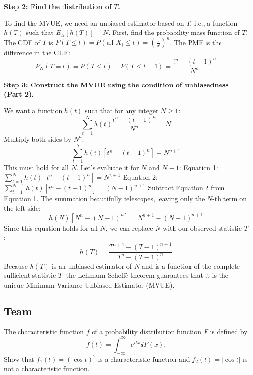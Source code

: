 \begin{solution}
\textbf{Step 2: Find the distribution of $T$.}

To find the MVUE, we need an unbiased estimator based on $T$, i.e., a function $h(T)$ such that $E_N[h(T)] = N$.
First, find the probability mass function of $T$.
The CDF of $T$ is $P(T \leq t) = P(\text{all } X_i \leq t) = \left( \frac{t}{N} \right)^n$.
The PMF is the difference in the CDF:
\[ P_N(T = t) = P(T \leq t) - P(T \leq t-1) = \frac{t^n - (t-1)^n}{N^n} \]

\textbf{Step 3: Construct the MVUE using the condition of unbiasedness (Part 2).}

We want a function $h(t)$ such that for any integer $N \geq 1$:
\[ \sum_{t=1}^N h(t) \frac{t^n - (t-1)^n}{N^n} = N \]
Multiply both sides by $N^n$:
\[ \sum_{t=1}^N h(t) \left[ t^n - (t-1)^n \right] = N^{n+1} \]
This must hold for all $N$. Let's evaluate it for $N$ and $N-1$:
Equation 1: $\sum_{t=1}^N h(t) \left[ t^n - (t-1)^n \right] = N^{n+1}$
Equation 2: $\sum_{t=1}^{N-1} h(t) \left[ t^n - (t-1)^n \right] = (N-1)^{n+1}$
Subtract Equation 2 from Equation 1. The summation beautifully telescopes, leaving only the $N$-th term on the left side:
\[ h(N) \left[ N^n - (N-1)^n \right] = N^{n+1} - (N-1)^{n+1} \]
Since this equation holds for all $N$, we can replace $N$ with our observed statistic $T$:
\[ h(T) = \frac{T^{n+1} - (T-1)^{n+1}}{T^n - (T-1)^n} \]
Because $h(T)$ is an unbiased estimator of $N$ and is a function of the complete sufficient statistic $T$, the Lehmann-Scheffé theorem guarantees that it is the unique Minimum Variance Unbiased Estimator (MVUE).
\end{solution}

\subsection{Team}

\begin{exercise}
\label{probability:2013:7}
The characteristic function $f$ of a probability distribution function $F$ is defined by
\[ f(t) = \int_{-\infty}^{\infty} e^{itx} dF(x). \]
Show that $f_1(t) = (\cos t)^2$ is a characteristic function and $f_2(t) = |\cos t|$ is not a characteristic function.
\end{exercise}

